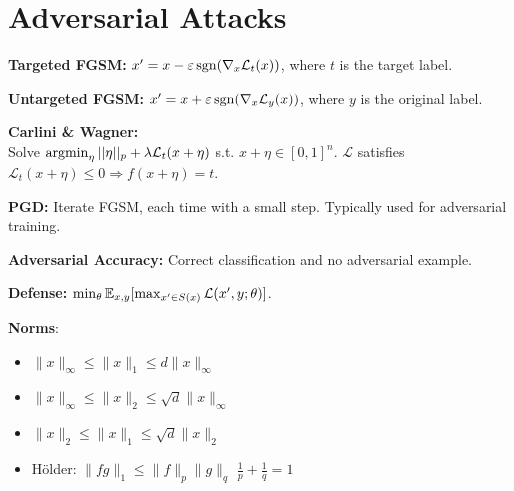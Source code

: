 \section{Adversarial Attacks}
\textbf{Targeted FGSM:} $x^\prime = x - \varepsilon \operatorname{\operatorname{sgn}}(\nabla_x \mathcal{L}_t(x))$, where $t$ is the target label.

\textbf{Untargeted FGSM:} $x^\prime = x + \varepsilon \operatorname{\operatorname{sgn}}(\nabla_x \mathcal{L}_y (x))$, where $y$ is the original label.

\textbf{Carlini \& Wagner:}\\
Solve $\operatorname{\operatorname{argmin}}_\eta ||\eta||_p+\lambda \mathcal{L}_t(x+\eta)$ s.t. $x+\eta\in [0,1]^n$. $\mathcal{L}$ satisfies $\mathcal{L}_t(x+\eta)\le 0 \Rightarrow f(x+\eta)=t$.

\textbf{PGD:} Iterate FGSM, each time with a small step. Typically used for adversarial training.

\textbf{Adversarial Accuracy:} Correct classification and no adversarial example.

\textbf{Defense:} $\min_\theta \mathbb{E}_{x,y} [\max_{x^\prime\in S(x)} \mathcal{L}(x^\prime, y; \theta)]$.

\textbf{Norms}:
\begin{itemize}
    \item[] $\|x\|_\infty\leq\|x\|_1\leq d\|x\|_\infty$
    \item[] $\|x\|_\infty\leq\|x\|_2\leq\sqrt{d}\|x\|_\infty$
    \item[] $\|x\|_2\leq\|x\|_1\leq\sqrt{d}\|x\|_2$
    \item[] Hölder: $\|fg\|_1\leq\|f\|_p\|g\|_q$  $\frac{1}{p}+\frac{1}{q}=1$
\end{itemize}
